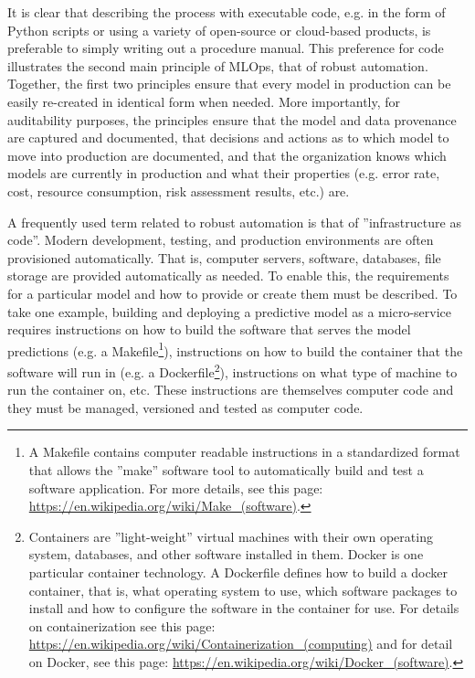 It is clear that describing the process with executable code, e.g. in the form of Python scripts or using a variety of open-source or cloud-based products, is preferable to simply writing out a procedure manual. This preference for code illustrates the second main principle of MLOps, that of robust automation. Together, the first two principles ensure that every model in production can be easily re-created in identical form when needed. More importantly, for auditability purposes, the principles ensure that the model and data provenance are captured and documented, that decisions and actions as to which model to move into production are documented, and that the organization knows which models are currently in production and what their properties (e.g. error rate, cost, resource consumption, risk assessment results, etc.) are.

A frequently used term related to robust automation is that of ''infrastructure as code''. Modern development, testing, and production environments are often provisioned automatically. That is, computer servers, software, databases, file storage are provided automatically as needed. To enable this, the requirements for a particular model and how to provide or create them must be described. To take one example, building and deploying a predictive model as a micro-service requires instructions on how to build the software that serves the model predictions (e.g. a Makefile\footnote{A Makefile contains computer readable instructions in a standardized format that allows the ''make'' software tool to automatically build and test a software application. For more details, see this page: \url{https://en.wikipedia.org/wiki/Make_(software)}.}), instructions on how to build the container that the software will run in (e.g. a Dockerfile\footnote{Containers are ''light-weight'' virtual machines with their own operating system, databases, and other software installed in them. Docker is one particular container technology. A Dockerfile defines how to build a docker container, that is, what operating system to use, which software packages to install and how to configure the software in the container for use. For details on containerization see this page: \url{https://en.wikipedia.org/wiki/Containerization_(computing)} and for detail on Docker, see this page: \url{https://en.wikipedia.org/wiki/Docker_(software)}.}), instructions on what type of machine to run the container on, etc. These instructions are themselves computer code and they must be managed, versioned and tested as computer code. 

